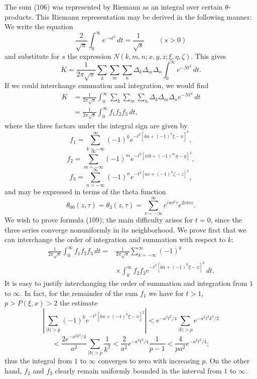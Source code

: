 The sum (106) was represented by Riemann as an integral over certain $\theta$-products. This Riemann representation may be derived in the following manner: We write the equation
\[
\frac2{\sqrt\pi}\int_0^{\infty}e^{-st^2}\,dt=\frac1{\sqrt s}\qquad(s>0)
\]
and substitute for $s$ the expression $N(k,m,n;x,y,z;\xi,\eta,\zeta)$. This gives
\[
K=\frac1{2\pi\sqrt\pi}\sum_k\sum_m\sum_n\Delta_k\Delta_m\Delta_n\int_0^{\infty}e^{-Nt^2}\,dt.
\]
If we could interchange summation and integration, we would find
\begin{equation}\tag{109}
\begin{aligned}
K&=\frac1{2\pi\sqrt\pi}\int_0^{\infty}\sum_k\sum_m\sum_n\Delta_k\Delta_m\Delta_n e^{-Nt^2}\,dt\\
&=\frac1{2\pi\sqrt\pi}\int_0^{\infty}f_1f_2f_3\,dt,
\end{aligned}
\end{equation}
where the three factors under the integral sign are given by
\[
f_1=\sum_{k=-\infty}^{\infty}(-1)^k e^{-t^2[ka+(-1)^k\xi-x]^2},
\]
\[
f_2=\sum_{m=-\infty}^{\infty}(-1)^m e^{-t^2[mb+(-1)^m\eta-y]^2},
\]
\[
f_3=\sum_{n=-\infty}^{\infty}(-1)^n e^{-t^2[nc+(-1)^n\zeta-z]^2},
\]
and may be expressed in terms of the theta function
\[
\theta_{00}(z,\tau)=\theta_3(z,\tau)=\sum_{\nu=-\infty}^{\infty}e^{i\pi\nu^2\tau}e^{2i\pi\nu z}.
\]
We wish to prove formula (109); the main difficulty arises for $t=0$, since the three series converge nonuniformly in its neighborhood. We prove first that we can interchange the order of integration and summation with respect to $k$:
\begin{equation}\tag{110}
\begin{aligned}
\frac1{2\pi\sqrt\pi}\int_0^{\infty}f_1f_2f_3\,dt
={}&\frac1{2\pi\sqrt\pi}\sum_{k=-\infty}^{\infty}(-1)^k\\
&\times\int_0^{\infty}f_2f_3e^{-t^2[ka+(-1)^k\xi-x]^2}\,dt.
\end{aligned}
\end{equation}
It is easy to justify interchanging the order of summation and integration from $1$ to $\infty$. In fact, for the remainder of the sum $f_1$ we have for $t>1$, $p>P(\xi,x)>2$ the estimate
\[
\left|\sum_{|k|>p}(-1)^k e^{-t^2[ka+(-1)^k\xi-x]^2}\right|
<e^{-a^2t^2/4}\sum_{|k|>p}e^{-a^2t^2k^2/2}
\]
\[
<\frac{2e^{-a^2t^2/4}}{a^2}\sum_{|k|>p}\frac1{k^2}
<\frac2{a^2}e^{-a^2t^2/4}\frac1{p-1}
<\frac4{pa^2}e^{-a^2t^2/4};
\]
thus the integral from $1$ to $\infty$ converges to zero with increasing $p$. On the other hand, $f_2$ and $f_3$ clearly remain uniformly bounded in the interval from $1$ to $\infty$.

